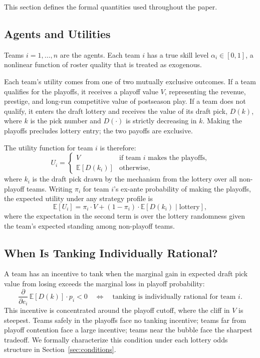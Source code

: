 \documentclass{article}
\begin{document}
This section defines the formal quantities used throughout the paper.

\subsection{Agents and Utilities}

Teams $i = 1, \ldots, n$ are the agents.
Each team $i$ has a true skill level $\alpha_i \in [0,1]$, a nonlinear
function of roster quality that is treated as exogenous.

Each team's utility comes from one of two mutually exclusive outcomes.
If a team qualifies for the playoffs, it receives a playoff value $V$,
representing the revenue, prestige, and long-run competitive value of
postseason play.
If a team does not qualify, it enters the draft lottery and receives the
value of its draft pick, $D(k)$, where $k$ is the pick number and
$D(\cdot)$ is strictly decreasing in $k$.
Making the playoffs precludes lottery entry; the two payoffs are exclusive.

The utility function for team $i$ is therefore:
\[
    U_i =
    \begin{cases}
        V & \text{if team $i$ makes the playoffs,} \\
        \mathbb{E}[D(k_i)] & \text{otherwise,}
    \end{cases}
\]
where $k_i$ is the draft pick drawn by the mechanism from the lottery over
all non-playoff teams.
Writing $\pi_i$ for team $i$'s ex-ante probability of making the playoffs,
the expected utility under any strategy profile is
\[
    \mathbb{E}[U_i] = \pi_i \cdot V
                    + (1 - \pi_i) \cdot \mathbb{E}[D(k_i) \mid \text{lottery}],
\]
where the expectation in the second term is over the lottery randomness
given the team's expected standing among non-playoff teams.

\subsection{When Is Tanking Individually Rational?}

A team has an incentive to tank when the marginal gain in expected draft pick
value from losing exceeds the marginal loss in playoff probability:
\[
    \frac{\partial}{\partial e_i}\,\mathbb{E}[D(k)] \cdot p_i < 0
    \quad \Longleftrightarrow \quad
    \text{tanking is individually rational for team } i.
\]
This incentive is concentrated around the playoff cutoff, where the cliff in
$V$ is steepest.
Teams safely in the playoffs face no tanking incentive; teams far from playoff
contention face a large incentive; teams near the bubble face the sharpest
tradeoff.
We formally characterize this condition under each lottery odds structure in
Section~\ref{sec:conditions}.
\end{document}
